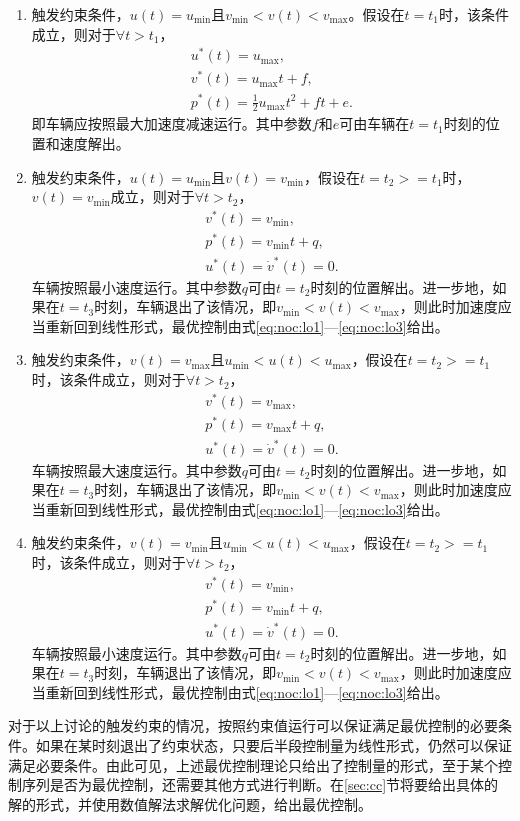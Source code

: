 \begin{enumerate}[label=(\arabic*)]
\item 触发约束条件，$u(t)=u_{\min}$且$v_{\min}<v(t)<v_{\max}$。假设在$t=t_1$时，该条件成立，则对于$\forall t>t_1$，
\begin{gather}
u^*(t)=u_{\max},\\
v^*(t)=u_{\max}t+f,\\
p^*(t)=\frac12u_{\max}t^2+ft+e.
\end{gather}
即车辆应按照最大加速度减速运行。其中参数$f$和$e$可由车辆在$t=t_1$时刻的位置和速度解出。
\item 触发约束条件，$u(t)=u_{\min}$且$v(t)=v_{\min}$，假设在$t=t_2>=t_1$时，$v(t)=v_{\min}$成立，则对于$\forall t>t_2$，
\begin{gather}
v^*(t)=v_{\min},\\
p^*(t)=v_{\min}t+q,\\
u^*(t)=\dot{v}^*(t)=0.
\end{gather}
车辆按照最小速度运行。其中参数$q$可由$t=t_2$时刻的位置解出。进一步地，如果在$t=t_3$时刻，车辆退出了该情况，即$v_{\min}<v(t)<v_{\max}$，则此时加速度应当重新回到线性形式，最优控制由式\eqref{eq:noc:lo1}---\eqref{eq:noc:lo3}给出。
\item 触发约束条件，$v(t)=v_{\max}$且$u_{\min}<u(t)<u_{\max}$，假设在$t=t_2>=t_1$时，该条件成立，则对于$\forall t>t_2$，
\begin{gather}
v^*(t)=v_{\max},\\
p^*(t)=v_{\max}t+q,\\
u^*(t)=\dot{v}^*(t)=0.
\end{gather}
车辆按照最大速度运行。其中参数$q$可由$t=t_2$时刻的位置解出。进一步地，如果在$t=t_3$时刻，车辆退出了该情况，即$v_{\min}<v(t)<v_{\max}$，则此时加速度应当重新回到线性形式，最优控制由式\eqref{eq:noc:lo1}---\eqref{eq:noc:lo3}给出。
\item 触发约束条件，$v(t)=v_{\min}$且$u_{\min}<u(t)<u_{\max}$，假设在$t=t_2>=t_1$时，该条件成立，则对于$\forall t>t_2$，
\begin{gather}
v^*(t)=v_{\min},\\
p^*(t)=v_{\min}t+q,\\
u^*(t)=\dot{v}^*(t)=0.
\end{gather}
车辆按照最小速度运行。其中参数$q$可由$t=t_2$时刻的位置解出。进一步地，如果在$t=t_3$时刻，车辆退出了该情况，即$v_{\min}<v(t)<v_{\max}$，则此时加速度应当重新回到线性形式，最优控制由式\eqref{eq:noc:lo1}---\eqref{eq:noc:lo3}给出。
\end{enumerate}
\begin{remark}
对于以上讨论的触发约束的情况，按照约束值运行可以保证满足最优控制的必要条件。如果在某时刻退出了约束状态，只要后半段控制量为线性形式，仍然可以保证满足必要条件。由此可见，上述最优控制理论只给出了控制量的形式，至于某个控制序列是否为最优控制，还需要其他方式进行判断。在\ref{sec:cc}节将要给出具体的解的形式，并使用数值解法求解优化问题，给出最优控制。
\end{remark}